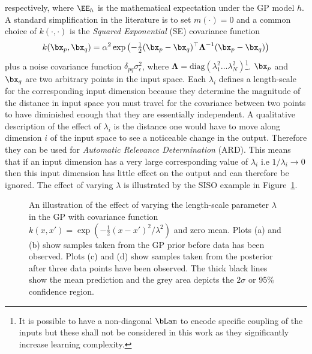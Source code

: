 respectively, where $\EE_h$ is the mathematical expectation under the GP model $h$. A standard simplification in the literature is to set $m(\cdot)=0$ and a common choice of $k(\cdot,\cdot)$ is the \textit{Squared Exponential} (SE) covariance function 
\begin{equation}\label{SE}
k(\bx_p,\bx_q) = \alpha^2\exp\left(-\tfrac{1}{2}(\bx_p-\bx_q)^\top\boldsymbol\Lambda^{-1}(\bx_p-\bx_q)\right)
\end{equation}
plus a noise covariance function $\delta_{pq}\sigma^2_\epsilon$, where $\boldsymbol\Lambda = \mathrm{diag} (\lambda^{2}_{1}\dots \lambda^{2}_{N})$\footnote{It is possible to have a non-diagonal $\bLam$ to encode specific coupling of the inputs but these shall not be considered in this work as they significantly increase learning complexity.}. $\bx_p$ and $\bx_q$ are two arbitrary points in the input space. Each $\lambda_i$ defines a length-scale for the corresponding input dimension because they determine the magnitude of the distance in input space you must travel for the covariance between two points to have diminished enough that they are essentially independent. A qualitative description of the effect of $\lambda_i$ is the distance one would have to move along dimension $i$ of the input space to see a noticeable change in the output. Therefore they can be used for \textit{Automatic Relevance Determination} (ARD). This means that if an input dimension has a very large corresponding value of $\lambda_i$ i.e $1/\lambda_i \rightarrow 0$ then this input dimension has little effect on the output and can therefore be ignored. The effect of varying $\lambda$ is illustrated by the SISO example in Figure~\ref{lengthsca}.

\begin{figure}[t]
\centering
{} %
\hfill
{}
\hfill
{}
\caption{\small An illustration of the effect of varying the length-scale parameter $\lambda$ in the GP with covariance function $k(x,x') = \exp\left(-\tfrac{1}{2}(x-x')^2/\lambda^2\right)$ and zero mean. Plots (a) and (b) show samples taken from the GP prior before data has been observed. Plots (c) and (d) show samples taken from the posterior after three data points have been observed. The thick black lines show the mean prediction and the grey area depicts the $2\sigma$ or 95\% confidence region.}
\label{lengthsca}
\end{figure}


